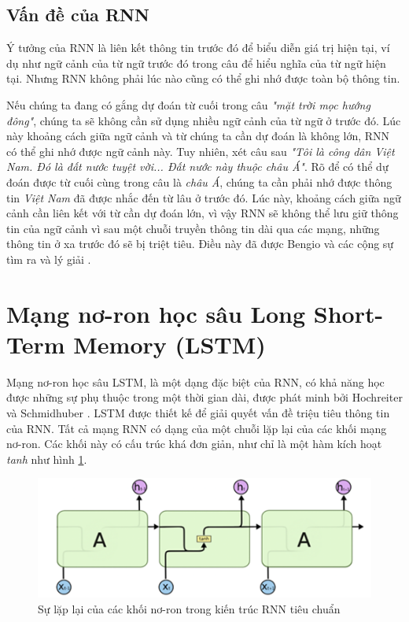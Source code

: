 \subsection{Vấn đề của RNN}
Ý tưởng của RNN là liên kết thông tin trước đó để biểu diễn giá trị hiện tại, ví dụ như ngữ cảnh của từ ngữ trước đó trong câu để hiểu nghĩa của từ ngữ hiện tại. Nhưng RNN không phải lúc nào cũng có thể ghi nhớ được toàn bộ thông tin.

Nếu chúng ta đang có gắng dự đoán từ cuối trong câu \textit{"mặt trời mọc hướng đông"}, chúng ta sẽ không cần sử dụng nhiều ngữ cảnh của từ ngữ ở trước đó. Lúc này khoảng cách giữa ngữ cảnh và từ chúng ta cần dự đoán là không lớn, RNN có thể ghi nhớ được ngữ cảnh này. Tuy nhiên, xét câu sau \textit{"Tôi là công dân Việt Nam. Đó là đất nước tuyệt vời... Đất nước này thuộc châu Á"}. Rõ để có thể dự đoán được từ cuối cùng trong câu là \textit{châu Á}, chúng ta cần phải nhớ được thông tin \textit{Việt Nam} đã được nhắc đến từ lâu ở trước đó. Lúc này, khoảng cách giữa ngữ cảnh cần liên kết với từ cần dự đoán lớn, vì vậy RNN sẽ không thể lưu giữ thông tin của ngữ cảnh vì sau một chuỗi truyền thông tin dài qua các mạng, những thông tin ở xa trước đó sẽ bị triệt tiêu. Điều này đã được Bengio và các cộng sự tìm ra và lý giải \cite{st18}.

\section{Mạng nơ-ron học sâu Long Short-Term Memory (LSTM)}
Mạng nơ-ron học sâu LSTM, là một dạng đặc biệt của RNN, có khả năng học được những sự phụ thuộc trong một thời gian dài, được phát minh bởi Hochreiter và Schmidhuber \cite{st11}. LSTM được thiết kế để giải quyết vấn đề triệu tiêu thông tin của RNN. Tất cả mạng RNN có dạng của một chuỗi lặp lại của các khối mạng nơ-ron. Các khối này có cấu trúc khá đơn giản, như chỉ là một hàm kích hoạt \textit{tanh} như hình \ref{fig:2-7}.

\begin{figure}[H]
    \centering
    \includegraphics[scale=0.75]{./content/images/2-7.png}
    \caption{Sự lặp lại của các khối nơ-ron trong kiến trúc RNN tiêu chuẩn}
    \label{fig:2-7}
\end{figure}

